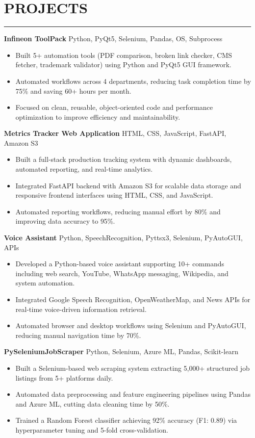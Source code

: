 \documentclass[10pt,a4paper]{article}
\newcommand{\sectionline}{
\vspace{-2pt}
\hrule
\vspace{4pt}
}
\begin{document}
\section*{PROJECTS}
\sectionline

\textbf{Infineon ToolPack} \textbar{} Python, PyQt5, Selenium, Pandas, OS, Subprocess
\begin{itemize}
\item Built 5+ automation tools (PDF comparison, broken link checker, CMS fetcher, trademark validator) using Python and PyQt5 GUI framework.
\item Automated workflows across 4 departments, reducing task completion time by 75\% and saving 60+ hours per month.
\item Focused on clean, reusable, object-oriented code and performance optimization to improve efficiency and maintainability.
\end{itemize}

\textbf{Metrics Tracker Web Application} \textbar{} HTML, CSS, JavaScript, FastAPI, Amazon S3
\begin{itemize}
\item Built a full-stack production tracking system with dynamic dashboards, automated reporting, and real-time analytics.
\item Integrated FastAPI backend with Amazon S3 for scalable data storage and responsive frontend interfaces using HTML, CSS, and JavaScript.
\item Automated reporting workflows, reducing manual effort by 80\% and improving data accuracy to 95\%.
\end{itemize}

\textbf{Voice Assistant} \textbar{} Python, SpeechRecognition, Pyttsx3, Selenium, PyAutoGUI, APIs
\begin{itemize}
\item Developed a Python-based voice assistant supporting 10+ commands including web search, YouTube, WhatsApp messaging, Wikipedia, and system automation.
\item Integrated Google Speech Recognition, OpenWeatherMap, and News APIs for real-time voice-driven information retrieval.
\item Automated browser and desktop workflows using Selenium and PyAutoGUI, reducing manual navigation time by 70\%.
\end{itemize}

\textbf{PySeleniumJobScraper} \textbar{} Python, Selenium, Azure ML, Pandas, Scikit-learn
\begin{itemize}
\item Built a Selenium-based web scraping system extracting 5,000+ structured job listings from 5+ platforms daily.
\item Automated data preprocessing and feature engineering pipelines using Pandas and Azure ML, cutting data cleaning time by 50\%.
\item Trained a Random Forest classifier achieving 92\% accuracy (F1: 0.89) via hyperparameter tuning and 5-fold cross-validation.
\end{itemize}
\end{document}

